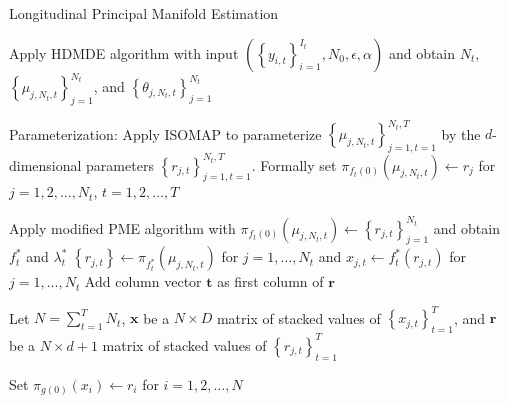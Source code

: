 \documentclass[11pt,reqno]{article}
\begin{document}
\begin{algorithm}
\caption{Longitudinal Principal Manifold Estimation}\label{alg:lpme}
 {
  Apply HDMDE algorithm with input $\left(\left\{y_{i, t}\right\}_{i = 1}^{I_t}, N_0, \epsilon, \alpha\right)$ and obtain $N_t$, $\left\{\mu_{j, N_t, t}\right\}_{j = 1}^{N_t}$, and $\left\{\theta_{j, N_t, t}\right\}_{j = 1}^{N_t}$\;
}

Parameterization: Apply ISOMAP to parameterize $\left\{\mu_{j, N_t, t}\right\}_{j = 1, t = 1}^{N_t, T}$ by the $d$-dimensional parameters $\left\{r_{j, t}\right\}_{j = 1, t = 1}^{N_t, T}$. Formally set $\pi_{f_t(0)}(\mu_{j, N_t, t}) \gets r_j$ for $j = 1, 2, \dots, N_t$, $t = 1, 2, \dots, T$\;

 {
  Apply modified PME algorithm with $\pi_{f_t(0)}(\mu_{j, N_t, t}) \gets \left\{r_{j, t}\right\}_{j = 1}^{N_t}$ and obtain $f_t^*$ and $\lambda_t^*$\;
  $\left\{r_{j, t}\right\} \gets \pi_{f_t^*}(\mu_{j, N_t, t})$ for $j = 1, \dots, N_t$ and $x_{j, t} \gets f_t^*(r_{j, t})$ for $j = 1, \dots, N_t$\;
  Add column vector $\mathbf{t}$ as first column of $\mathbf{r}$\;
}

Let $N = \sum_{t=1}^{T}N_t$, $\mathbf{x}$ be a $N \times D$ matrix of stacked values of $\left\{x_{j, t}\right\}_{t = 1}^T$, and $\mathbf{r}$ be a $N \times d + 1$ matrix of stacked values of $\left\{r_{j, t}\right\}_{t = 1}^T$ \;

Set $\pi_{g(0)}(x_i) \gets r_i$ for $i = 1, 2, \dots, N$\;


\end{algorithm}
\end{document}
